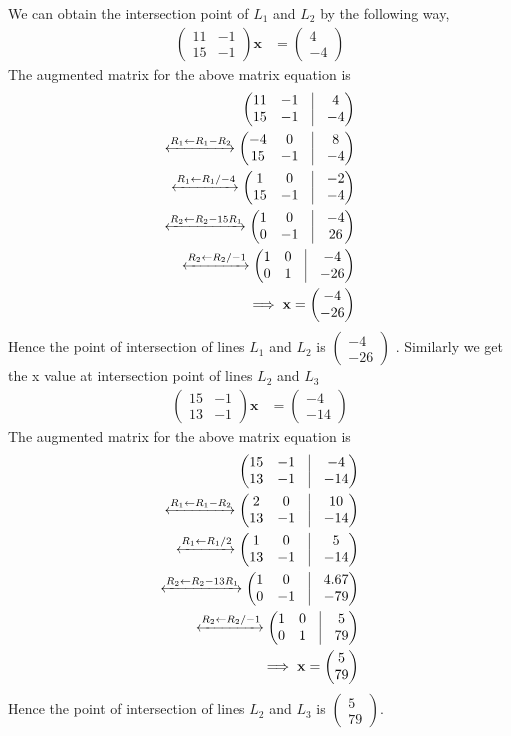 \documentclass[16pt, a4paper, two column]{article}
\newcommand{\myvec}[1]{\ensuremath{\begin{pmatrix}#1\end{pmatrix}}}
\let\vec\mathbf
\begin{document}
We can obtain the intersection point of $L_1$ and $L_2$ by the following way,
\begin{align}
	\myvec{11 & -1 \\
		15 & -1}\vec{x} &= \myvec{4 \\ -4} 
\end{align}
The augmented matrix for the above matrix equation is 
\begin{align}
	\myvec{ 11 & -1 & \vrule & 4 \\
		15 & -1 & \vrule & -4} \\
	\xleftrightarrow[]{R_1 \leftarrow R_1-R_2}
		\myvec{ -4 & 0 & \vrule & 8 \\
			15 & -1 & \vrule & -4} \\
	\xleftrightarrow[]{R_1 \leftarrow R_1/-4}
		\myvec{ 1 & 0 & \vrule & -2 \\
			15 & -1 &\vrule & -4} \\
	\xleftrightarrow[]{R_2 \leftarrow R_2-15R_1}
		\myvec{ 1 & 0 & \vrule & -4 \\
			0 & -1 & \vrule & 26} \\
	\xleftrightarrow[]{ R_2 \leftarrow R_2/-1}
		\myvec{ 1 & 0 & \vrule & -4 \\
			0 & 1 & \vrule & -26} \\
	\implies \vec{x} = \myvec{-4 \\ -26}
\end{align}
Hence the point of intersection of lines $L_1$ and $L_2$ is $\myvec{-4 \\ -26}$ .\newline
Similarly we get the x value at intersection point of lines $L_2$ and $L_3$
\begin{align}
	\myvec{15 & -1 \\
		13 & -1}\vec{x} &= \myvec{-4 \\ -14}
\end{align}
The augmented matrix for the above matrix equation is 
\begin{align}
	\myvec{ 15 & -1 & \vrule & -4 \\
		13 & -1 & \vrule & -14} \\
	\xleftrightarrow[]{R_1 \leftarrow R_1-R_2}
		\myvec{ 2 & 0 & \vrule & 10 \\
			13 & -1 & \vrule & -14} \\
	\xleftrightarrow[]{R_1 \leftarrow R_1/2}
		\myvec{ 1 & 0 & \vrule & 5 \\
			13 & -1 &\vrule & -14} \\
	\xleftrightarrow[]{R_2 \leftarrow R_2-13R_1}
		\myvec{ 1 & 0 & \vrule &  4.67\\
			0 & -1 & \vrule & -79} \\
	\xleftrightarrow[]{R_2 \leftarrow R_2/-1}
		\myvec{ 1 & 0 & \vrule &  5\\
			0 & 1 & \vrule & 79} \\
	\implies \vec{x} = \myvec{5 \\ 79}
\end{align}
Hence the point of intersection of lines $L_2$ and $L_3$ is $\myvec{5 \\ 79}$.\newline
\end{document}
